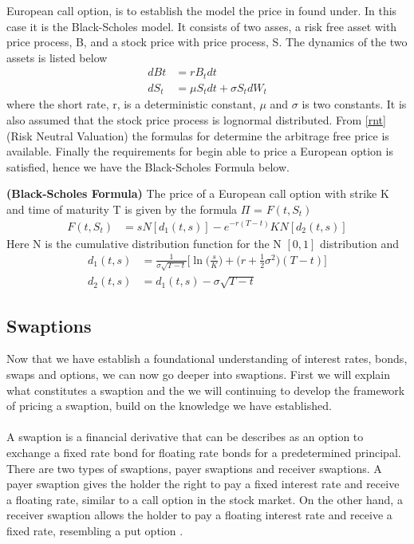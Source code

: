 European call option, is to establish the model the price in found under. In this case it is the Black-Scholes model.
It consists of two asses, a risk free asset with price process, B, and a stock price with price process, S.
The dynamics of the two assets is listed below
\begin{align*}
    dBt & = rB_t dt \\
    dS_t &= \mu S_t dt + \sigma S_t dW_t
\end{align*}
where the short rate, r, is  a deterministic constant,  $\mu$ and $\sigma$ is two constants. It is also assumed
that the stock price process is lognormal distributed. From \autoref{rnt}
(Risk Neutral Valuation) the formulas for determine the arbitrage free price is available. Finally the requirements
for begin able to price a European option is satisfied, hence we have the Black-Scholes Formula below.
\begin{proposition}
    \textbf{(Black-Scholes Formula)} The price of a European call option with strike K and time of maturity T 
    is given by the formula $\Pi$ = $F(t,S_t)$
    \begin{align*}
        F(t,S_t) & =s N[d_1(t,s)] -e^{-r(T-t)}KN[d_2(t,s)] 
    \end{align*}
    Here N is the cumulative distribution function for the N $[0,1]$ distribution and 
    \begin{align*}
        d_1(t,s) &= \frac{1}{\sigma \sqrt{T-t}} \Big[ \ln \Big(\frac{s}{K} \Big) +  \Big(r + \frac{1}{2} \sigma^2)(T-t)  \Big] \\
        d_2(t,s) &= d_1(t,s)-\sigma \sqrt{T-t}
    \end{align*}
    \cite{Bjork}
\end{proposition}
\subsection{Swaptions}
Now that we have establish a foundational understanding of interest rates, bonds, swaps and options, we can
now go deeper into swaptions. First we will explain what constitutes a swaption and the we will continuing 
to develop the framework of pricing a swaption, build on the knowledge we have established.  
\\\\
A swaption is a financial derivative that can be describes as an option to exchange a fixed rate bond for
floating rate bonds for a predetermined principal. 
There are two types of swaptions, payer swaptions and receiver swaptions.
A payer swaption gives the holder the right to pay a fixed interest rate and receive a floating rate, 
similar to a call option in the stock market. On the other hand, a receiver swaption allows the holder
to pay a floating interest rate and receive a fixed rate, resembling a put option \cite{Lindstrom} .


